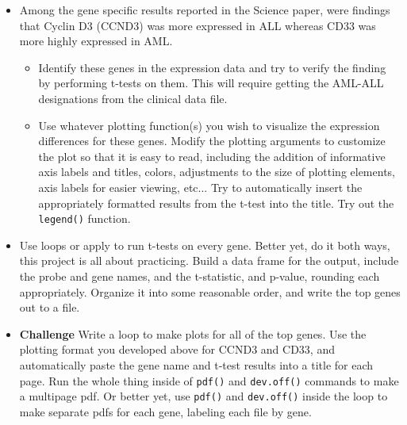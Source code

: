 \documentclass[11pt]{article}
\begin{document}
\begin{itemize}
\item Among the gene specific results reported in the Science paper, were findings that Cyclin D3 (CCND3) was more expressed in ALL whereas CD33 was more highly expressed in AML.  
\begin{itemize}
\item Identify these genes in the expression data and try to verify the finding by performing t-tests on them.  This will require getting the AML-ALL designations from the clinical data file.  
\item Use whatever plotting function(s) you wish to visualize the expression differences for these genes. Modify the plotting arguments to customize the plot so that it is easy to read, including the addition of informative axis labels and titles, colors, adjustments to the size of plotting elements, axis labels for easier viewing, etc...   Try to automatically insert the appropriately formatted results from the t-test into the title.  Try out the {\tt legend()} function.  
\end{itemize}
\item Use loops or apply to run t-tests on every gene.  Better yet, do it both ways, this project is all about practicing. Build a data frame for the output, include the probe and gene names, and the t-statistic, and p-value, rounding each appropriately.   Organize it into some reasonable order, and write the top genes out to a file.
\item {\bf Challenge} Write a loop to make plots for all of the top genes.  Use the plotting format you developed above for CCND3 and CD33, and automatically paste the gene name and t-test results into a title for each page.  Run the whole thing inside of {\tt pdf()} and {\tt dev.off()} commands to make a multipage pdf.  Or better yet, use {\tt pdf()} and {\tt dev.off()} inside the loop to make separate pdfs for each gene, labeling each file by gene.   
\end{itemize}  
\end{document}
